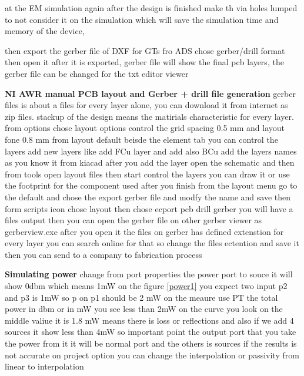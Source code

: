 \documentclass{article}
\begin{document}
\begin{itemize}
at the EM simulation again after the design is finished make th via holes lumped to not consider it on the simulation which will save the simulation time and memory of the device,


then export the gerber file of DXF for GTs fro ADS  chose gerber/drill format then open it after it is exported, 
gerber file will show the final pcb layers, 
the gerber file can be changed for the txt editor viewer 





\textbf{NI AWR manual PCB layout and Gerber + drill file generation}
gerber files is about a files for every layer alone, you can download it from internet as zip files.
stackup of the design means the matirials characteristic for every layer. 
from options chose layout options 
control the grid spacing 0.5 mm 
and layout fone  0.8 mm
from layout default beisde the element tab you can control the layers add new layers like add FCu layer and add also BCu add the layers names as you know it from kiacad 
after you add the layer open the schematic and then from tools  open layout files then start control the layers you  can draw it or use the footprint for the component used
after you finish from the layout menu go to the default and chose the export gerber file and modfy the name and save
then form scripts icon chose layout then  chose  ecport pcb drill gerber 
you will have a files output then you can open the gerber file on other gerber viewer as gerberview.exe
after you open it the files on gerber has defined extenstion for every layer you can search online for that 
so change the files ectention and save it then you can send to a company to fabrication process 






\textbf{Simulating power}
change from port properties the power port to souce it will show 0dbm which means 1mW 
on the figure \cref{power1} you expect two input p2 and p3 is 1mW so p on p1 should be 2 mW 
on the meaure use PT the total power in dbm or in mW 
you see less than 2mW 
on the curve you look on the middle valiue it is 1.8 mW means there is loss or reflections 
and also if we add 4 sources it show less than 4mW 
so important point the output port that you take the power from it it will be normal port and the others is sources
if the results is not accurate on project option you can change the interpolation or passivity  from  linear to interpolation 



\end{itemize}
\end{document}
